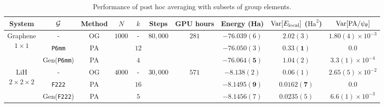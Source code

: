 \begin{table*}[h]
    \centering 
    \scriptsize
    \captionsetup{font=footnotesize}
    \begin{tabular}{||c|c|c|c|c|c|c||c|c|| c ||}
        \hline 
        System & $\mathcal{G}$ & Method  & $N$ & $k$ & 
         Steps & GPU hours & Energy (Ha) & $\text{\rm Var}[E_{\rm local}]$ ($\text{Ha}^2$) & $\text{\rm Var}[ {\rm PA} / \psi_\theta ]$  \\ 
        \hline
        \multirow{3}{*}{
            \parbox{1.5cm}{
                \centering 
                Graphene \\ 
                $1\times1$
            }
        }
        &
        -
        & OG &
        \multirow{3}{*}{
            \parbox{2em}{
                \centering 
               $1000$
            }
        }
         & - & 
        \multirow{3}{*}{
            \parbox{3.2em}{
                \centering 
               $80,000$
            }
        }
         &
         \multirow{3}{*}{
            \parbox{2em}{
                \centering 
               $281$
            }
        }
        & $-76.039(6)$ & $2.02(3)$ & $1.80(4) \times 10^{-3}$
        \\
        &
        \texttt{P6mm}
        & PA & & $12$ & & & $-76.050(3)$ & $\mathbf{0.33(1)}$  & $\mathbf{0.0}$
        \\
        &
        Gen(\texttt{P6mm})
        & PA &  & $4$ & & & $\mathbf{-76.064(5)}$ & $1.04(2)$ & $3.3(1) \times 10^{-4}$
        \\
        \hline
        \multirow{3}{*}{
            \parbox{1.5cm}{
                \centering 
                LiH \\
                $2\times2 \times 2$ 
            }
        }
        & - & OG & 
        \multirow{3}{*}{
             \parbox{2em}{
                 \centering 
                 $4000$
             }
         }  & - & 
         \multirow{3}{*}{
              \parbox{3.2em}{
                  \centering 
                  $30,000$
              }
          }  & 
          \multirow{3}{*}{
              \parbox{2em}{
                  \centering 
                  $571$
              }
          }
          & $-8.138(2)$ & $0.06(1)$ & $2.65(5) \times 10^{-2}$
        \\
        & \texttt{F222} & PA & & $16$ & & &  $\mathbf{-8.1495(9)}$ & $\mathbf{0.0162(7)}$ & $\mathbf{0.0}$
        \\
        & Gen(\texttt{F222}) & PA & & $5$ & & & $-8.1456(7)$ & $0.0235(5)$ & $6.6(1) \times 10^{-3}$
        \\ 
        \hline
    \end{tabular}
    \caption{Performance of post hoc averaging with subsets of group elements.} \vspace{-2em}
    \label{table:stats:subset}
\end{table*}


